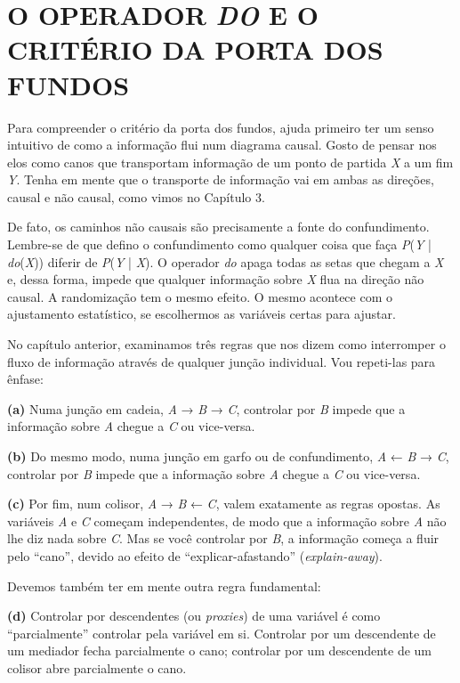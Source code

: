 \documentclass[11pt,a5paper,twoside]{book}
\begin{document}
\section{O OPERADOR \textit{DO} E O CRITÉRIO DA PORTA DOS FUNDOS}
Para compreender o critério da porta dos fundos, ajuda primeiro ter um senso intuitivo de como a informação flui num diagrama causal. Gosto de pensar nos elos como canos que transportam informação de um ponto de partida \textit{X} a um fim \textit{Y}. Tenha em mente que o transporte de informação vai em ambas as direções, causal e não causal, como vimos no Capítulo 3.

De fato, os caminhos não causais são precisamente a fonte do confundimento. Lembre-se de que defino o confundimento como qualquer coisa que faça \textit{P}(\textit{Y} | \textit{do}(\textit{X})) diferir de \textit{P}(\textit{Y} | \textit{X}). O operador \textit{do} apaga todas as setas que chegam a \textit{X} e, dessa forma, impede que qualquer informação sobre \textit{X} flua na direção não causal. A randomização tem o mesmo efeito. O mesmo acontece com o ajustamento estatístico, se escolhermos as variáveis certas para ajustar.

No capítulo anterior, examinamos três regras que nos dizem como interromper o fluxo de informação através de qualquer junção individual. Vou repeti-las para ênfase:

\textbf{(a)} Numa junção em cadeia, \textit{A} → \textit{B} → \textit{C}, controlar por \textit{B} impede que a informação sobre \textit{A} chegue a \textit{C} ou vice-versa.

\textbf{(b)} Do mesmo modo, numa junção em garfo ou de confundimento, \textit{A} ← \textit{B} → \textit{C}, controlar por \textit{B} impede que a informação sobre \textit{A} chegue a \textit{C} ou vice-versa.

\textbf{(c)} Por fim, num colisor, \textit{A} → \textit{B} ← \textit{C}, valem exatamente as regras opostas. As variáveis \textit{A} e \textit{C} começam independentes, de modo que a informação sobre \textit{A} não lhe diz nada sobre \textit{C}. Mas se você controlar por \textit{B}, a informação começa a fluir pelo “cano”, devido ao efeito de “explicar-afastando” (\textit{explain-away}).

Devemos também ter em mente outra regra fundamental:

\textbf{(d)} Controlar por descendentes (ou \textit{proxies}) de uma variável é como “parcialmente” controlar pela variável em si. Controlar por um descendente de um mediador fecha parcialmente o cano; controlar por um descendente de um colisor abre parcialmente o cano.
\end{document}
